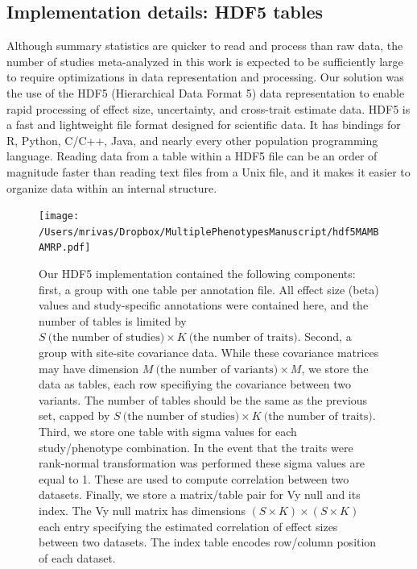 \documentclass{nature}
\begin{document}
\subsection{Implementation details: HDF5 tables}
Although summary statistics are quicker to read and process than raw data, the number of studies meta-analyzed in this work is expected to be sufficiently large to require optimizations in data representation and processing. Our solution was the use of the HDF5 (Hierarchical Data Format 5) data representation to enable rapid processing of effect size, uncertainty, and cross-trait estimate data. HDF5 is a fast and lightweight file format designed for scientific data. It has bindings for R, Python, C/C++, Java, and nearly every other population programming language. Reading data from a table within a HDF5 file can be an order of magnitude faster than reading text files from a Unix file, and it makes it easier to organize data within an internal structure.


\begin{figure}
\centering
\texttt{[image: /Users/mrivas/Dropbox/MultiplePhenotypesManuscript/hdf5MAMBAMRP.pdf]}
  \caption{Our HDF5 implementation contained the following components: first, a group with one table per annotation file. All effect size (beta) values and study-specific annotations were contained here, and the number of tables is limited by $S\ \textrm{(the number of studies)} \times K\ \textrm{(the number of traits)}$. Second, a group with site-site covariance data. While these covariance matrices may have dimension $M\ \textrm{(the number of variants)} \times M$, we store the data as tables, each row specifiying the covariance between two variants. The number of tables should be the same as the previous set, capped by $S\ \textrm{(the number of studies)} \times K\ \textrm{(the number of traits)}$. Third, we store one table with sigma values for each study/phenotype combination. In the event that the traits were rank-normal transformation was performed these sigma values are equal to 1. These are used to compute correlation between two datasets. Finally, we store a matrix/table pair for Vy null and its index. The Vy null matrix has dimensions $ (S \times K) \times (S \times K)$ each entry specifying the estimated correlation of effect sizes between two datasets. The index table encodes row/column position of each dataset.}
  \label{hdf5}
\end{figure}

 


\newpage


\end{document}
